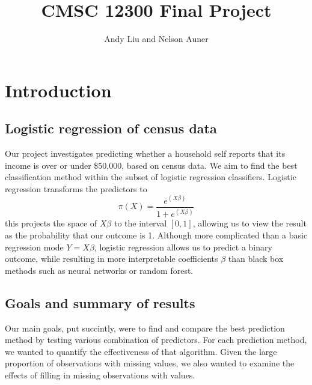 \documentclass[11pt]{article}
\title{CMSC 12300 Final Project}
\author{Andy Liu and Nelson Auner}
\begin{document}
\maketitle
\section{Introduction}

\subsection{Logistic regression of census data}
Our project investigates predicting whether a household self reports that its income is over or under \$50,000, based on census data. 
We aim to find the best classification method within the subset of logistic regression classifiers. Logistic regression transforms the predictors to
\begin{equation}
\pi(X) = \frac{e^{(X\beta)}}{1+e^{(X\beta)}}
\end{equation}
this projects the space of $X \beta$ to the interval $[0,1]$, allowing us to view the result as the probability that our outcome is 1. Although more complicated than a basic regression mode $Y = X\beta$, logistic regression allows us to predict a binary outcome, while resulting in more interpretable coefficients $\beta$ than black box methods such as neural networks or random forest. 
\subsection{Goals and summary of results}
Our main goals, put succintly, were to find and compare the best prediction method by testing various combination of predictors. For each prediction method, we wanted to quantify the effectiveness of that algorithm. Given the large proportion of observations with missing values, we also wanted to examine the effects of filling in missing observations with values. 
\end{document}
